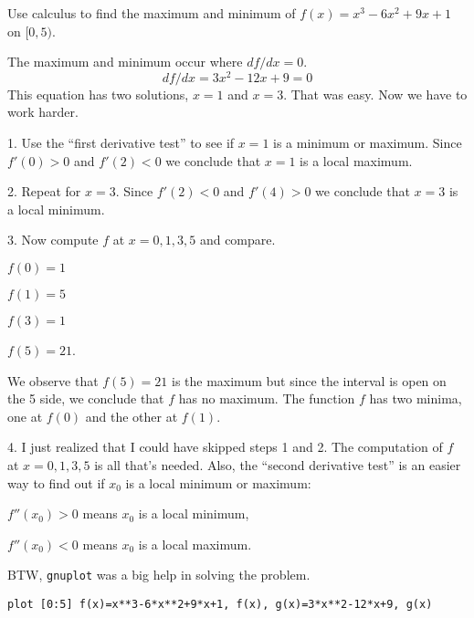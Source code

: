 
Use calculus to find the maximum and minimum of
$f(x)=x^3-6x^2+9x+1$ on $[0,5)$.

\medskip

The maximum and minimum occur where $df/dx=0$.
$$df/dx=3x^2-12x+9=0$$
This equation has two solutions, $x=1$ and $x=3$.
That was easy. Now we have to work harder.

1. Use the ``first derivative test'' to see if $x=1$ is a minimum or maximum.
Since $f'(0)>0$ and $f'(2)<0$ we conclude that $x=1$ is a local maximum.

2. Repeat for $x=3$.
Since $f'(2)<0$ and $f'(4)>0$ we conclude that $x=3$ is a local minimum.

3. Now compute $f$ at $x=0,1,3,5$ and compare.

$f(0)=1$

$f(1)=5$

$f(3)=1$

$f(5)=21$.

We observe that $f(5)=21$ is the maximum 
but since the interval is open on the 5 side, we conclude that $f$
has no maximum.
The function $f$ has two minima, one at $f(0)$ and the other at $f(1)$.

4. I just realized that I could have skipped steps 1 and 2.
The computation of $f$ at $x=0,1,3,5$ is all that's needed.
Also, the ``second derivative test'' is an easier way to find out if $x_0$ is a
local minimum or maximum:

$f''(x_0)>0$ means $x_0$ is a local minimum,

$f''(x_0)<0$ means $x_0$ is a local maximum.


\bigskip
BTW, {\tt gnuplot} was a big help in solving the problem.

\centerline{\tt plot [0:5] f(x)=x**3-6*x**2+9*x+1, f(x), g(x)=3*x**2-12*x+9, g(x)}

